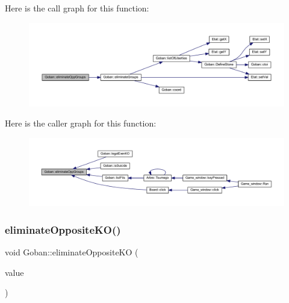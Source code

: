 Here is the call graph for this function\+:\nopagebreak
\begin{figure}[H]
\begin{center}
\leavevmode
\includegraphics[width=350pt]{class_goban_a7858b815885e4af36f05f9d26182cb07_cgraph}
\end{center}
\end{figure}
Here is the caller graph for this function\+:\nopagebreak
\begin{figure}[H]
\begin{center}
\leavevmode
\includegraphics[width=350pt]{class_goban_a7858b815885e4af36f05f9d26182cb07_icgraph}
\end{center}
\end{figure}
\mbox{\label{class_goban_a6c4b62a9469b3876d250ab94bcd562e5}} 
\subsubsection{\texorpdfstring{eliminate\+Opposite\+K\+O()}{eliminateOppositeKO()}}
{\footnotesize\ttfamily void Goban\+::eliminate\+Opposite\+KO (\begin{DoxyParamCaption}\item[{const \hyperlink{class_etat_af3ddb2296ffc379b7f3ad2bf832f294e}{Etat\+::\+V\+AL} \&}]{value }\end{DoxyParamCaption})}

